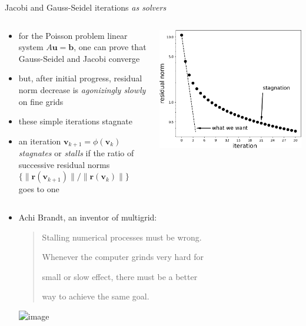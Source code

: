 \documentclass[10pt,
               svgnames,
               hyperref={colorlinks,citecolor=DeepPink4,linkcolor=FireBrick,urlcolor=Maroon},
               usepdftitle=false]{beamer}
\newcommand{\bb}{\mathbf{b}}
\newcommand{\br}{\mathbf{r}}
\newcommand{\bu}{\mathbf{u}}
\newcommand{\bv}{\mathbf{v}}
\begin{document}
\begin{frame}{Jacobi and Gauss-Seidel iterations \emph{as solvers}}

\begin{columns}
\begin{column}{0.5\textwidth}
\begin{itemize}
\item for the Poisson problem linear system $A\bu=\bb$, one can prove that Gauss-Seidel and Jacobi converge
\item but, after initial progress, residual norm decrease is \emph{agonizingly slowly} on fine grids
\item these simple iterations stagnate
\item an iteration $\bv_{k+1} = \phi(\bv_k)$ \emph{stagnates} or \emph{stalls} if the ratio of successive residual norms $\{\|\br(\bv_{k+1})\|/\|\br(\bv_k)\|\}$ goes to one
\end{itemize}
\end{column}
\begin{column}{0.5\textwidth}
\includegraphics[width=\textwidth]{images/stagnation.png}
\end{column}
\end{columns}

\bigskip
\begin{itemize}
\item<2> Achi Brandt, an inventor of multigrid:
\begin{quotation}
Stalling numerical processes must be wrong.

Whenever the computer grinds very hard for

small or slow effect, there must be a better

way to achieve the same goal.
\end{quotation}


\vspace{-19mm}
\hfill \includegraphics<2>[width=0.18\textwidth]{images/abrandt.jpg}
\end{itemize}
\end{frame}
\end{document}
